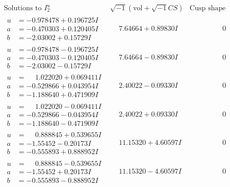 \documentclass[1p]{elsarticle_modified}
\theoremstyle{definition}
\newcommand{\I}{\sqrt{-1}}
\begin{document}
$$\begin{array}{c|c|c}  
\text{Solutions to }I^u_{2}& \I (\text{vol} + \sqrt{-1}CS) & \text{Cusp shape}\\
 \hline 
\begin{aligned}
u &= -0.978478 + 0.196725 I \\
a &= -0.470303 + 0.120405 I \\
b &= -2.03002 + 0.15729 I\end{aligned}
 & \phantom{-}7.64664 + 0.89830 I & \phantom{-0.000000 } 0 \\ \hline\begin{aligned}
u &= -0.978478 - 0.196725 I \\
a &= -0.470303 - 0.120405 I \\
b &= -2.03002 - 0.15729 I\end{aligned}
 & \phantom{-}7.64664 - 0.89830 I & \phantom{-0.000000 } 0 \\ \hline\begin{aligned}
u &= \phantom{-}1.022020 + 0.069411 I \\
a &= -0.529866 + 0.043954 I \\
b &= -1.188640 + 0.471909 I\end{aligned}
 & \phantom{-}2.40022 - 0.09330 I & \phantom{-0.000000 } 0 \\ \hline\begin{aligned}
u &= \phantom{-}1.022020 - 0.069411 I \\
a &= -0.529866 - 0.043954 I \\
b &= -1.188640 - 0.471909 I\end{aligned}
 & \phantom{-}2.40022 + 0.09330 I & \phantom{-0.000000 } 0 \\ \hline\begin{aligned}
u &= \phantom{-}0.888845 + 0.539655 I \\
a &= -1.55452 - 0.20173 I \\
b &= -0.555893 + 0.888952 I\end{aligned}
 & \phantom{-}11.15320 + 4.60597 I & \phantom{-0.000000 } 0 \\ \hline\begin{aligned}
u &= \phantom{-}0.888845 - 0.539655 I \\
a &= -1.55452 + 0.20173 I \\
b &= -0.555893 - 0.888952 I\end{aligned}
 & \phantom{-}11.15320 - 4.60597 I & \phantom{-0.000000 } 0 \\ \hline\begin{aligned}

\end{aligned}
\end{array}$$
\end{document}
